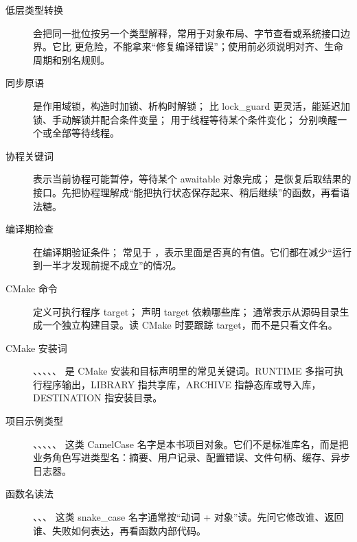\begin{description}
  \item[低层类型转换]  会把同一批位按另一个类型解释，常用于对象布局、字节查看或系统接口边界。它比  更危险，不能拿来“修复编译错误”；使用前必须说明对齐、生命周期和别名规则。
  \item[同步原语]  是作用域锁，构造时加锁、析构时解锁； 比 lock\_guard 更灵活，能延迟加锁、手动解锁并配合条件变量； 用于线程等待某个条件变化； 分别唤醒一个或全部等待线程。
  \item[协程关键词]  表示当前协程可能暂停，等待某个 awaitable 对象完成； 是恢复后取结果的接口。先把协程理解成“能把执行状态保存起来、稍后继续”的函数，再看语法糖。
  \item[编译期检查]  在编译期验证条件； 常见于 ，表示里面是否真的有值。它们都在减少“运行到一半才发现前提不成立”的情况。
  \item[CMake 命令]  定义可执行程序 target； 声明 target 依赖哪些库； 通常表示从源码目录生成一个独立构建目录。读 CMake 时要跟踪 target，而不是只看文件名。
  \item[CMake 安装词] 、、、、、 是 CMake 安装和目标声明里的常见关键词。RUNTIME 多指可执行程序输出，LIBRARY 指共享库，ARCHIVE 指静态库或导入库，DESTINATION 指安装目录。
  \item[项目示例类型] 、、、、、 这类 CamelCase 名字是本书项目对象。它们不是标准库名，而是把业务角色写进类型名：摘要、用户记录、配置错误、文件句柄、缓存、异步日志器。
  \item[函数名读法] 、、、 这类 snake\_case 名字通常按“动词 + 对象”读。先问它修改谁、返回谁、失败如何表达，再看函数内部代码。
\end{description}
